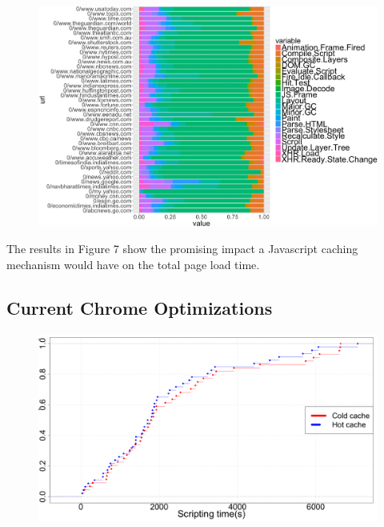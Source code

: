 \begin{figure}[t!]
\centering
\includegraphics[width=0.9\columnwidth]{figs/comp_2.png}
\label{fig:cat_p2}
\end{figure}


The results in Figure 7 show the promising impact a Javascript 
caching mechanism would have on the total page load time.

\subsection{Current Chrome Optimizations}

\begin{figure}[t]
\centering
\includegraphics[width=0.9\columnwidth]{figs/chrome_script.png}
\label{fig:scripting_p2}
\end{figure}

